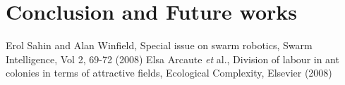 \documentclass{llncs}
\begin{document}
\section{Conclusion and Future works}
\label{sec:conc}
%
%
%
\begin{thebibliography}{}
%
%
Erol Sahin and Alan Winfield, Special issue on swarm robotics, Swarm Intelligence, Vol 2, 69-72 (2008)
Elsa Arcaute \textit{et} al., Division of labour in ant colonies in terms of attractive fields, Ecological Complexity, Elsevier (2008)
\end{thebibliography}
%
\end{document}
